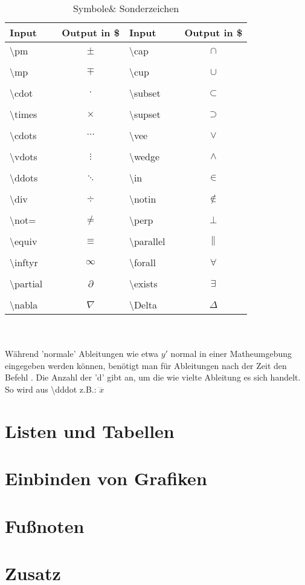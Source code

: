 \documentclass[titlepage=firstiscover]{scrartcl}
\begin{document}
\begin{table}
  \centering
  \caption{Symbole\& Sonderzeichen}
  \label{tab:sym}
  \begin{tabular}{l c c l c c}
    \toprule
    Input & & Output in \$ & Input & & Output in \$
    \\
    \midrule
    \textbackslash pm & & $\pm$ & \textbackslash cap & & $\cap$ \\
    \\
    \textbackslash mp & & $\mp$ & \textbackslash cup & & $\cup$ \\
    \\
    \textbackslash cdot & & $\cdot$ &\textbackslash subset & & $\subset$ \\
    \\
    \textbackslash times & & $\times$ &\textbackslash supset & & $\supset$ \\
    \\
    \textbackslash cdots & & $\cdots$ &\textbackslash vee & & $\vee$ \\
    \\
    \textbackslash vdots & & $\vdots$ &\textbackslash wedge & & $\wedge$ \\
    \\
    \textbackslash ddots & & $\ddots$ &\textbackslash in & & $\in$ \\
    \\
    \textbackslash div & & $\div$ &\textbackslash notin & & $\notin$ \\
    \\
    \textbackslash not= & & $\not=$ &\textbackslash perp & & $\perp$ \\
    \\
    \textbackslash equiv & & $\equiv$ &\textbackslash parallel & & $\parallel$\\
    \\
    \textbackslash inftyr & & $\infty$ &\textbackslash forall & & $\forall$ \\
    \\
    \textbackslash partial & & $\partial$ &\textbackslash exists & & $\exists$ \\
    \\
    \textbackslash nabla & & $\nabla$ &\textbackslash Delta & & $\Delta$ \\
    \bottomrule
  \end{tabular}
\end{table}
\\
\\
Während 'normale' Ableitungen wie etwa $y'$ normal in einer Matheumgebung
eingegeben werden können, benötigt man für Ableitungen nach der Zeit
den Befehl . Die Anzahl der 'd' gibt an, um die wie vielte
Ableitung es sich handelt. So wird aus \textbackslash dddot z.B.:
$\dddot x$ \\
\section{Listen und Tabellen}
\section{Einbinden von Grafiken}
\section{Fußnoten}
\section{Zusatz}
\end{document}
